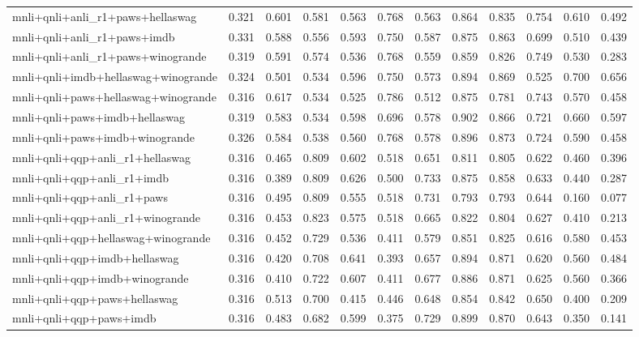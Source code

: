 \begin{table}[t]
\begin{tabular}{lrrrrrrrrrrr}
    mnli+qnli+anli\_r1+paws+hellaswag & 0.321 & 0.601 & 0.581 & 0.563 & 0.768 & 0.563 & 0.864 & 0.835 & 0.754 & 0.610 & 0.492 \\
    mnli+qnli+anli\_r1+paws+imdb & 0.331 & 0.588 & 0.556 & 0.593 & 0.750 & 0.587 & 0.875 & 0.863 & 0.699 & 0.510 & 0.439 \\
    mnli+qnli+anli\_r1+paws+winogrande & 0.319 & 0.591 & 0.574 & 0.536 & 0.768 & 0.559 & 0.859 & 0.826 & 0.749 & 0.530 & 0.283 \\
    mnli+qnli+imdb+hellaswag+winogrande & 0.324 & 0.501 & 0.534 & 0.596 & 0.750 & 0.573 & 0.894 & 0.869 & 0.525 & 0.700 & 0.656 \\
    mnli+qnli+paws+hellaswag+winogrande & 0.316 & 0.617 & 0.534 & 0.525 & 0.786 & 0.512 & 0.875 & 0.781 & 0.743 & 0.570 & 0.458 \\
    mnli+qnli+paws+imdb+hellaswag & 0.319 & 0.583 & 0.534 & 0.598 & 0.696 & 0.578 & 0.902 & 0.866 & 0.721 & 0.660 & 0.597 \\
    mnli+qnli+paws+imdb+winogrande & 0.326 & 0.584 & 0.538 & 0.560 & 0.768 & 0.578 & 0.896 & 0.873 & 0.724 & 0.590 & 0.458 \\
    mnli+qnli+qqp+anli\_r1+hellaswag & 0.316 & 0.465 & 0.809 & 0.602 & 0.518 & 0.651 & 0.811 & 0.805 & 0.622 & 0.460 & 0.396 \\
    mnli+qnli+qqp+anli\_r1+imdb & 0.316 & 0.389 & 0.809 & 0.626 & 0.500 & 0.733 & 0.875 & 0.858 & 0.633 & 0.440 & 0.287 \\
    mnli+qnli+qqp+anli\_r1+paws & 0.316 & 0.495 & 0.809 & 0.555 & 0.518 & 0.731 & 0.793 & 0.793 & 0.644 & 0.160 & 0.077 \\
    mnli+qnli+qqp+anli\_r1+winogrande & 0.316 & 0.453 & 0.823 & 0.575 & 0.518 & 0.665 & 0.822 & 0.804 & 0.627 & 0.410 & 0.213 \\
    mnli+qnli+qqp+hellaswag+winogrande & 0.316 & 0.452 & 0.729 & 0.536 & 0.411 & 0.579 & 0.851 & 0.825 & 0.616 & 0.580 & 0.453 \\
    mnli+qnli+qqp+imdb+hellaswag & 0.316 & 0.420 & 0.708 & 0.641 & 0.393 & 0.657 & 0.894 & 0.871 & 0.620 & 0.560 & 0.484 \\
    mnli+qnli+qqp+imdb+winogrande & 0.316 & 0.410 & 0.722 & 0.607 & 0.411 & 0.677 & 0.886 & 0.871 & 0.625 & 0.560 & 0.366 \\
    mnli+qnli+qqp+paws+hellaswag & 0.316 & 0.513 & 0.700 & 0.415 & 0.446 & 0.648 & 0.854 & 0.842 & 0.650 & 0.400 & 0.209 \\
    mnli+qnli+qqp+paws+imdb & 0.316 & 0.483 & 0.682 & 0.599 & 0.375 & 0.729 & 0.899 & 0.870 & 0.643 & 0.350 & 0.141 \\

\end{tabular}
\end{table}
